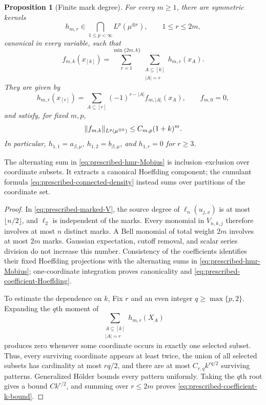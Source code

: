 \documentclass[11pt,reqno]{amsart}
\numberwithin{equation}{section}
\theoremstyle{plain}
\newtheorem{prop}[prop]{Proposition}
\theoremstyle{definition}
\DeclarePairedDelimiter{\norm}{\lVert}{\rVert}
\newcommand{\be}{\beta}
\begin{document}
\begin{prop}[Finite mark degree]
\label{prop:prescribed-mark-degree}
For every $m\geq1$, there are symmetric kernels
\begin{equation}
 h_{m,r}\in\bigcap_{1\leq p<\infty}L^p(\mu^{\otimes r}),
 \qquad 1\leq r\leq2m,
 \label{eq:prescribed-hmr-domain}
\end{equation}
canonical in every variable, such that
\begin{equation}
 f_{m,k}(x_{[k]})
 =\sum_{r=1}^{\min\{2m,k\}}
 \sum_{\substack{A\subseteq[k]\\|A|=r}}h_{m,r}(x_A).
 \label{eq:prescribed-coefficient-Hoeffding}
\end{equation}
They are given by
\begin{equation}
 h_{m,r}(x_{[r]})
 =\sum_{A\subseteq[r]}(-1)^{r-|A|}f_{m,|A|}(x_A),
 \qquad f_{m,0}=0,
 \label{eq:prescribed-hmr-Mobius}
\end{equation}
and satisfy, for fixed $m,p$,
\begin{equation}
 \norm{f_{m,k}}_{L^p(\mu^{\otimes k})}
 \leq C_{m,p}(1+k)^m.
 \label{eq:prescribed-coefficient-k-bound}
\end{equation}
In particular, $h_{1,1}=a_{\be,\mu}$, $h_{1,2}=b_{\be,\mu}$, and $h_{1,r}=0$ for $r\geq3$.
\end{prop}

The alternating sum in \eqref{eq:prescribed-hmr-Mobius} is inclusion--exclusion over coordinate subsets. It extracts a canonical Hoeffding component; the cumulant formula \eqref{eq:prescribed-connected-density} instead sums over partitions of the coordinate set.

\begin{proof}
In \eqref{eq:prescribed-marked-V}, the source degree of $\ell_n(u_{j,x})$ is at most $\lfloor n/2\rfloor$, and $\ell_2$ is independent of the marks.  Every monomial in $V_{n,k,j}$ therefore involves at most $n$ distinct marks.  A Bell monomial of total weight $2m$ involves at most $2m$ marks.  Gaussian expectation, cutoff removal, and scalar series division do not increase this number.  Consistency of the coefficients identifies their fixed Hoeffding projections with the alternating sums in \eqref{eq:prescribed-hmr-Mobius}; one-coordinate integration proves canonicality and \eqref{eq:prescribed-coefficient-Hoeffding}.

To estimate the dependence on $k$,  Fix $r$ and an even integer $q\geq\max\{p,2\}$.  Expanding the $q$th moment of
\begin{equation}
 \sum_{\substack{A\subseteq[k]\\|A|=r}}h_{m,r}(X_A)
 \label{eq:prescribed-canonical-sum}
\end{equation}
produces zero whenever some coordinate occurs in exactly one selected subset.  Thus, every surviving coordinate appears at least twice, the union of all selected subsets has cardinality at most $rq/2$, and there are at most $C_{r,q}k^{rq/2}$ surviving patterns.  Generalized H\"older bounds every pattern uniformly.  Taking the $q$th root gives a bound $Ck^{r/2}$, and summing over $r\leq2m$ proves \eqref{eq:prescribed-coefficient-k-bound}.
\end{proof}
\end{document}

